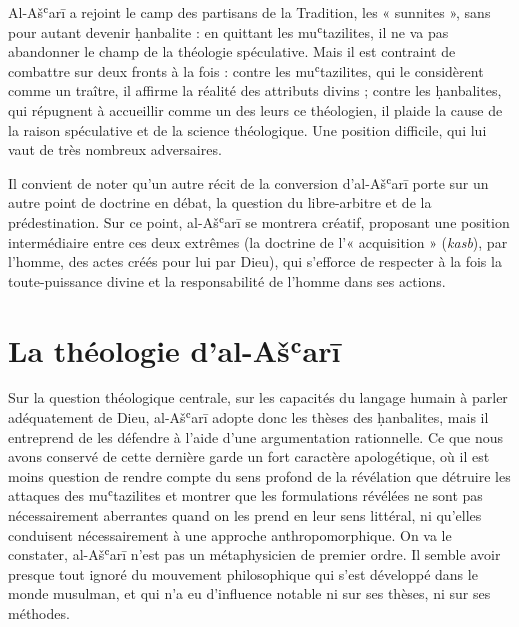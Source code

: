 Al-Ašʿarī a rejoint le camp des partisans de la Tradition, les «
sunnites », sans pour autant devenir ḥanbalite : en quittant les
muʿtazilites, il ne va pas abandonner le champ de la théologie
spéculative. Mais il est contraint de combattre sur deux fronts à la
fois : contre les muʿtazilites, qui le considèrent comme un traître, il
affirme la réalité des attributs divins ; contre les ḥanbalites, qui
répugnent à accueillir comme un des leurs ce théologien, il plaide
la cause de la raison spéculative et de la science théologique. Une
position difficile, qui lui vaut de très nombreux adversaires.

Il convient de noter qu'un autre récit de la conversion d'al-Ašʿarī
porte sur un autre point de doctrine en débat, la question du
libre-arbitre et de la prédestination. Sur ce point, al-Ašʿarī se
montrera créatif, proposant une position intermédiaire entre ces deux
extrêmes (la doctrine de l'« acquisition » (\emph{kasb}), par l'homme,
des actes créés pour lui par Dieu), qui s'efforce de respecter à la fois
la toute-puissance divine et la responsabilité de l'homme dans ses
actions.

\hypertarget{la-thuxe9ologie-dal-aux161ux2bfarux12b}{%
\section{La théologie
d'al-Ašʿarī}\label{la-thuxe9ologie-dal-aux161ux2bfarux12b}}

Sur la question théologique centrale, sur les capacités du langage
humain à parler adéquatement de Dieu, al-Ašʿarī adopte donc les thèses
des ḥanbalites, mais il entreprend de les défendre à l'aide d'une
argumentation rationnelle. Ce que nous avons conservé de cette dernière
garde un fort caractère apologétique, où il est moins question de rendre
compte du sens profond de la révélation que détruire les attaques des
muʿtazilites et montrer que les formulations révélées ne sont pas
nécessairement aberrantes quand on les prend en leur sens littéral, ni
qu'elles conduisent nécessairement à une approche anthropomorphique. On
va le constater, al-Ašʿarī n'est pas un métaphysicien de premier ordre.
Il semble avoir presque tout ignoré du mouvement philosophique qui s'est
développé dans le monde musulman, et qui n'a eu d'influence notable ni
sur ses thèses, ni sur ses méthodes.

